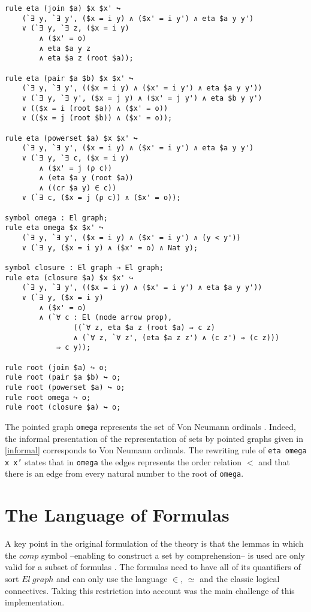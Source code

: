 \documentclass[submission,copyright,creativecommons]{eptcs}
\begin{document}
\begin{lstlisting}
rule eta (join $a) $x $x' ↪ 
	(`∃ y, `∃ y', ($x = i y) ∧ ($x' = i y') ∧ eta $a y y')
    ∨ (`∃ y, `∃ z, ($x = i y) 
    	∧ ($x' = o) 
    	∧ eta $a y z 
    	∧ eta $a z (root $a));

rule eta (pair $a $b) $x $x' ↪ 
	(`∃ y, `∃ y', (($x = i y) ∧ ($x' = i y') ∧ eta $a y y'))
    ∨ (`∃ y, `∃ y', ($x = j y) ∧ ($x' = j y') ∧ eta $b y y')
    ∨ (($x = i (root $a)) ∧ ($x' = o))
    ∨ (($x = j (root $b)) ∧ ($x' = o));

rule eta (powerset $a) $x $x' ↪ 
	(`∃ y, `∃ y', ($x = i y) ∧ ($x' = i y') ∧ eta $a y y')
    ∨ (`∃ y, `∃ c, ($x = i y) 
    	∧ ($x' = j (ρ c)) 
    	∧ (eta $a y (root $a)) 
    	∧ ((cr $a y) ∈ c))
    ∨ (`∃ c, ($x = j (ρ c)) ∧ ($x' = o));

symbol omega : El graph;
rule eta omega $x $x' ↪ 
	(`∃ y, `∃ y', ($x = i y) ∧ ($x' = i y') ∧ (y < y'))
    ∨ (`∃ y, ($x = i y) ∧ ($x' = o) ∧ Nat y);

symbol closure : El graph → El graph;
rule eta (closure $a) $x $x' ↪ 
	(`∃ y, `∃ y', (($x = i y) ∧ ($x' = i y') ∧ eta $a y y'))
	∨ (`∃ y, ($x = i y) 
        ∧ ($x' = o)
        ∧ (`∀ c : El (node arrow prop), 
                ((`∀ z, eta $a z (root $a) ⇒ c z)
                ∧ (`∀ z, `∀ z', (eta $a z z') ∧ (c z') ⇒ (c z)))
            ⇒ c y));
            
rule root (join $a) ↪ o;
rule root (pair $a $b) ↪ o;
rule root (powerset $a) ↪ o;
rule root omega ↪ o;
rule root (closure $a) ↪ o;

\end{lstlisting}

The pointed graph \texttt{omega} represents the set of Von Neumann ordinals \cite[see Table 2]{zermodulo53}. Indeed, the informal presentation of the representation of sets by pointed graphs given in \ref{informal} corresponds to Von Neumann ordinals. The rewriting rule of \texttt{eta omega x x'} states that in \texttt{omega} the edges represents the order relation $<$ and that there is an edge from every natural number to the root of \texttt{omega}.


\section{The Language of Formulas}

A key point in the original formulation of the theory is that the lemmas in which the $comp$ symbol --enabling to construct a set by comprehension-- is used are only valid for a subset of formulas \cite[see Table 5]{zermodulo}. The formulas need to have all of its quantifiers of sort $El~graph$ and can only use the language $\in$, $\simeq$ and the classic logical connectives. Taking this restriction into account was the main challenge of this implementation.
\end{document}
